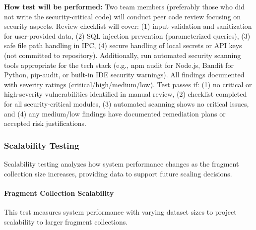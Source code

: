 \documentclass[12pt, titlepage]{article}
\begin{document}
\begin{enumerate}
\textbf{How test will be performed:} Two team members (preferably those who did not write the security-critical code) will conduct peer code review focusing on security aspects. Review checklist will cover: (1) input validation and sanitization for user-provided data, (2) SQL injection prevention (parameterized queries), (3) safe file path handling in IPC, (4) secure handling of local secrets or API keys (not committed to repository). Additionally, run automated security scanning tools appropriate for the tech stack (e.g., npm audit for Node.js, Bandit for Python, pip-audit, or built-in IDE security warnings). All findings documented with severity ratings (critical/high/medium/low). Test passes if: (1) no critical or high-severity vulnerabilities identified in manual review, (2) checklist completed for all security-critical modules, (3) automated scanning shows no critical issues, and (4) any medium/low findings have documented remediation plans or accepted risk justifications.

\end{enumerate}

\subsubsection{Scalability Testing}

Scalability testing analyzes how system performance changes as the fragment collection size increases, providing data to support future scaling decisions.

\paragraph{Fragment Collection Scalability}

This test measures system performance with varying dataset sizes to project scalability to larger fragment collections.
\end{document}
